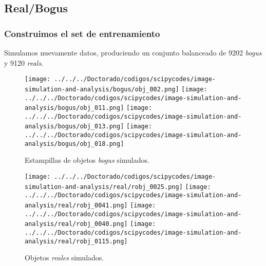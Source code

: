\documentclass[10pt]{beamer}
\begin{document}
\subsection{Real/Bogus}
\begin{frame}\frametitle{Construimos el set de entrenamiento}
Simulamos nuevamente datos, produciendo un conjunto balanceado de 9202 \textit{bogus} y 9120 \textit{reals}.
\begin{figure}
 \centering
 \texttt{[image: ../../../Doctorado/codigos/scipycodes/image-simulation-and-analysis/bogus/obj\_002.png]}
 \texttt{[image: ../../../Doctorado/codigos/scipycodes/image-simulation-and-analysis/bogus/obj\_011.png]}
 \texttt{[image: ../../../Doctorado/codigos/scipycodes/image-simulation-and-analysis/bogus/obj\_013.png]}
 \texttt{[image: ../../../Doctorado/codigos/scipycodes/image-simulation-and-analysis/bogus/obj\_018.png]}
 \caption{Estampillas de objetos \textit{bogus} simulados.}
 \label{fig:bogus}
\end{figure}
\begin{figure}
 \centering
 \texttt{[image: ../../../Doctorado/codigos/scipycodes/image-simulation-and-analysis/real/robj\_0025.png]}
 \texttt{[image: ../../../Doctorado/codigos/scipycodes/image-simulation-and-analysis/real/robj\_0041.png]}
 \texttt{[image: ../../../Doctorado/codigos/scipycodes/image-simulation-and-analysis/real/robj\_0040.png]}
 \texttt{[image: ../../../Doctorado/codigos/scipycodes/image-simulation-and-analysis/real/robj\_0115.png]}
 \caption{Objetos \textit{reales} simulados.}
 \label{fig:reals}
\end{figure}
\end{frame}
\end{document}
